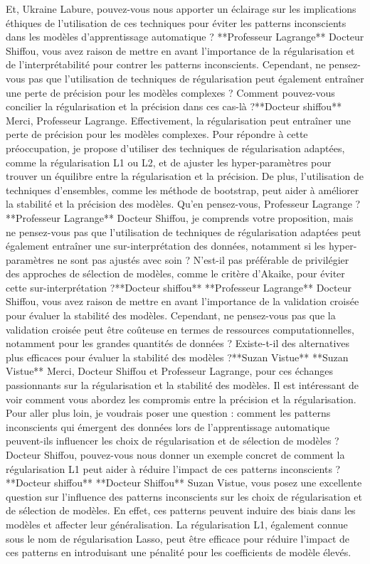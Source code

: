 Et, Ukraine Labure, pouvez-vous nous apporter un éclairage sur les implications éthiques de l'utilisation de ces techniques pour éviter les patterns inconscients dans les modèles d'apprentissage automatique ?
**Professeur Lagrange**
Docteur Shiffou, vous avez raison de mettre en avant l'importance de la régularisation et de l'interprétabilité pour contrer les patterns inconscients. Cependant, ne pensez-vous pas que l'utilisation de techniques de régularisation peut également entraîner une perte de précision pour les modèles complexes ? Comment pouvez-vous concilier la régularisation et la précision dans ces cas-là ?**Docteur shiffou**
Merci, Professeur Lagrange. Effectivement, la régularisation peut entraîner une perte de précision pour les modèles complexes. Pour répondre à cette préoccupation, je propose d'utiliser des techniques de régularisation adaptées, comme la régularisation L1 ou L2, et de ajuster les hyper-paramètres pour trouver un équilibre entre la régularisation et la précision. De plus, l'utilisation de techniques d'ensembles, comme les méthode de bootstrap, peut aider à améliorer la stabilité et la précision des modèles. Qu'en pensez-vous, Professeur Lagrange ?**Professeur Lagrange**
Docteur Shiffou, je comprends votre proposition, mais ne pensez-vous pas que l'utilisation de techniques de régularisation adaptées peut également entraîner une sur-interprétation des données, notamment si les hyper-paramètres ne sont pas ajustés avec soin ? N'est-il pas préférable de privilégier des approches de sélection de modèles, comme le critère d'Akaike, pour éviter cette sur-interprétation ?**Docteur shiffou**
**Professeur Lagrange**
Docteur Shiffou, vous avez raison de mettre en avant l'importance de la validation croisée pour évaluer la stabilité des modèles. Cependant, ne pensez-vous pas que la validation croisée peut être coûteuse en termes de ressources computationnelles, notamment pour les grandes quantités de données ? Existe-t-il des alternatives plus efficaces pour évaluer la stabilité des modèles ?**Suzan Vistue**
**Suzan Vistue**
Merci, Docteur Shiffou et Professeur Lagrange, pour ces échanges passionnants sur la régularisation et la stabilité des modèles. Il est intéressant de voir comment vous abordez les compromis entre la précision et la régularisation. Pour aller plus loin, je voudrais poser une question : comment les patterns inconscients qui émergent des données lors de l'apprentissage automatique peuvent-ils influencer les choix de régularisation et de sélection de modèles ? Docteur Shiffou, pouvez-vous nous donner un exemple concret de comment la régularisation L1 peut aider à réduire l'impact de ces patterns inconscients ?
**Docteur shiffou**
**Docteur Shiffou**
Suzan Vistue, vous posez une excellente question sur l'influence des patterns inconscients sur les choix de régularisation et de sélection de modèles. En effet, ces patterns peuvent induire des biais dans les modèles et affecter leur généralisation. La régularisation L1, également connue sous le nom de régularisation Lasso, peut être efficace pour réduire l'impact de ces patterns en introduisant une pénalité pour les coefficients de modèle élevés.

